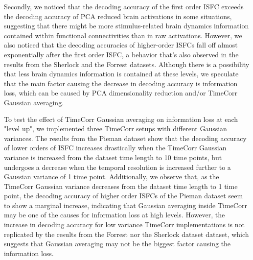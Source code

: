\documentclass[11pt]{article}
\begin{document}
Secondly, we noticed that the decoding accuracy of the first order ISFC exceeds the decoding accuracy of PCA reduced brain activations in some situations, suggesting that there might be more stimulus-related brain dynamics information contained within functional connectivities than in raw activations. However, we also noticed that the decoding accuracies of higher-order ISFCs fall off almost exponentially after the first order ISFC, a behavior that's also observed in the results from the Sherlock and the Forrest datasets. Although there is a possibility that less brain dynamics information is contained at these levels, we speculate that the main factor causing the decrease in decoding accuracy is information loss, which can be caused by PCA dimensionality reduction and/or TimeCorr Gaussian averaging.

To test the effect of TimeCorr Gaussian averaging on information loss at each "level up", we implemented three TimeCorr setups with different Gaussian variances. The results from the Pieman dataset show that the decoding accuracy of lower orders of ISFC increases drastically when the TimeCorr Gaussian variance is increased from the dataset time length to 10 time points, but undergoes a decrease when the temporal resolution is increased further to a Gaussian variance of 1 time point. Additionally, we observe that, as the TimeCorr Gaussian variance decreases from the dataset time length to 1 time point, the decoding accuracy of higher order ISFCs of the Pieman dataset seem to show a marginal increase, indicating that Gaussian averaging inside TimeCorr may be one of the causes for information loss at high levels. However, the increase in decoding accuracy for low variance TimeCorr implementations is not replicated by the results from the Forrest nor the Sherlock dataset dataset, which suggests that Gaussian averaging may not be the biggest factor causing the information loss.
\end{document}
